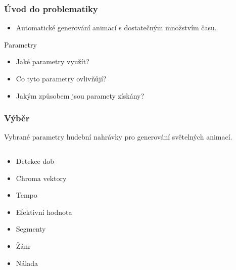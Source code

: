 \documentclass[%
  12pt,       				%
	t,                  %
	aspectratio=1610,   %
	unicode,						%
]{beamer}				    	%
\begin{document}
\begin{frame} 
	\frametitle{Úvod do problematiky}
	\begin{itemize}
		\item Automatické generování animací s dostatečným množstvím času.
	\end{itemize}


	\begin{block}{Parametry}
		\begin{itemize}
			\item Jaké parametry využít?
			\item Co tyto parametry ovlivňůjí? 
			\item Jakým způsobem jsou paramety získány?
		\end{itemize}
	\end{block}
\end{frame} 

\begin{frame}
	\frametitle{Výběr}
	Vybrané parametry hudební nahrávky pro generování světelných animací.
	\begin{columns}[T]
		\begin{column}{0.3\textwidth}		%
			\begin{itemize}
				\item Detekce dob
				\item Chroma vektory
				\item Tempo
				\item Efektivní hodnota 
				\item Segmenty
				\item Žánr
				\item Nálada
			\end{itemize}
		\end{column}
		\begin{column}{0.7\textwidth}		
		\end{column}
		
	\end{columns}
\end{frame}
\end{document}

